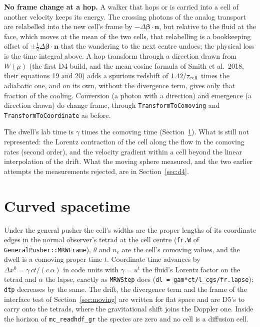 \documentclass[11pt]{article}
\begin{document}
\textbf{No frame change at a hop.}  A walker that hops or is carried into a cell of
another velocity keeps its energy.  The crossing photons of the analog transport are
relabelled into the new cell's frame by $-\Delta\boldsymbol{\beta}\cdot\boldsymbol{n}$,
but relative to the fluid at the face, which moves at the mean of the two cells, that
relabelling is a bookkeeping offset of $\pm\tfrac{1}{2}\Delta\boldsymbol{\beta}\cdot
\boldsymbol{n}$ that the wandering to the next centre undoes; the physical loss is the
time integral above.  A hop transform through a direction drawn from $W(\mu)$ (the
first D4 build, and the mean-cosine formula of Smith et al.\ 2018, their equations 19
and 20) adds a spurious redshift of $1.42/\tau_{\rm cell}$ times the adiabatic one, and
on its own, without the divergence term, gives only that fraction of the cooling.
Conversion (a photon with a direction) and emergence (a direction drawn) do change
frame, through \texttt{TransformToComoving} and \texttt{TransformToCoordinate} as
before.

The dwell's lab time is $\gamma$ times the comoving time (Section~\ref{sec:gr}).  What
is still not represented: the Lorentz contraction of the cell along the flow in the
comoving rates (second order), and the velocity gradient within a cell beyond the
linear interpolation of the drift.  What the moving sphere measured, and the two
earlier attempts the measurements rejected, are in Section~\ref{sec:d4}.

\section{Curved spacetime}
\label{sec:gr}

Under the general pusher the cell's widths are the proper lengths of its coordinate
edges in the normal observer's tetrad at the cell centre (\texttt{fr.W} of
\texttt{GeneralPusher::MRWFrame}), $\theta$ and $n_e$ are the cell's comoving values,
and the dwell is a comoving proper time $t$.  Coordinate time advances by
$\Delta x^0 = \gamma\,ct/(c\,\alpha)$ in code units with $\gamma = u^{\hat t}$ the
fluid's Lorentz factor on the tetrad and $\alpha$ the lapse, exactly as
\texttt{MRWStep} does (\texttt{dl = gam*ct/l\_cgs/fr.lapse}); \texttt{dtp} decreases by
the same.  The drift, the divergence term and the frame of the interface test of
Section~\ref{sec:moving} are written for flat space and are D5's to carry onto the
tetrads, where the gravitational shift joins the Doppler one.  Inside the horizon of
\texttt{mc\_readhdf\_gr} the species are zero and no cell is a diffusion cell.
\end{document}
